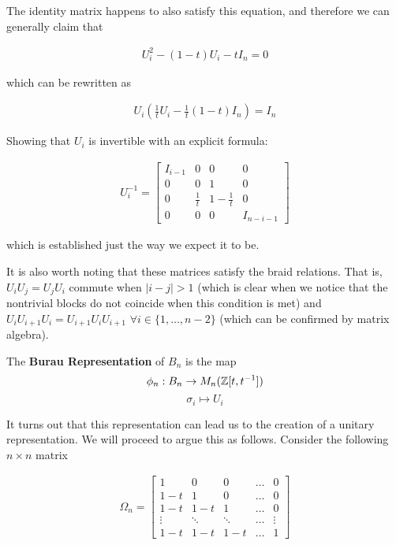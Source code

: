 The identity matrix happens to also satisfy this equation, and therefore we can generally claim that 

\begin{equation}
\begin{aligned}
	U_i^2 - (1-t)U_i - tI_n = 0
\end{aligned}
\end{equation}

which can be rewritten as 

\begin{equation}
\begin{aligned}
	U_i(\frac{1}{t}U_i - \frac{1}{t}(1-t)I_n) =I_n 
\end{aligned}
\end{equation}

Showing that $U_i$ is invertible with an explicit formula:

\begin{equation}
\begin{aligned}
	U_i^{-1}=\begin{bmatrix}
			I_{i-1}& 0 & 0 & 0 \\
			0 & 0 & 1 & 0\\
			0 & \frac{1}{t} & 1-\frac{1}{t} & 0\\
			0 & 0 & 0 & I_{n-i-1}
		\end{bmatrix}
\end{aligned}
\end{equation}

which is established just the way we expect it to be.

It is also worth noting that these matrices satisfy the braid relations. That is, $U_iU_j=U_jU_i$ commute when $|i-j|>1$ (which is clear when we notice that the nontrivial blocks do not coincide when this condition is met) and $U_iU_{i+1}U_i=U_{i+1}U_iU_{i+1}$ $\forall i\in\{1,\hdots,n-2\}$ (which can be confirmed by matrix algebra).

\begin{definition}
	The \textbf{Burau Representation} of $B_n$ is the map 
$$\phi_n:B_n\rightarrow M_n(\mathbb{Z}[t,t^{-1}])$$
$$\sigma_i \mapsto U_i$$
\end{definition}

It turns out that this representation can lead us to the creation of a unitary representation. We will proceed to argue this as follows. Consider the following $n\times n$ matrix

\begin{equation}
\begin{aligned}
	\Omega_n = \begin{bmatrix}
						1 & 0 & 0 &\hdots & 0 \\
						1-t & 1 & 0 & \hdots & 0 \\
						1-t & 1-t & 1 & \hdots & 0 \\
						\vdots&\ddots&\ddots&\hdots&\vdots\\
						1-t & 1-t & 1-t & \hdots & 1
					\end{bmatrix}
\end{aligned}
\end{equation}\\

